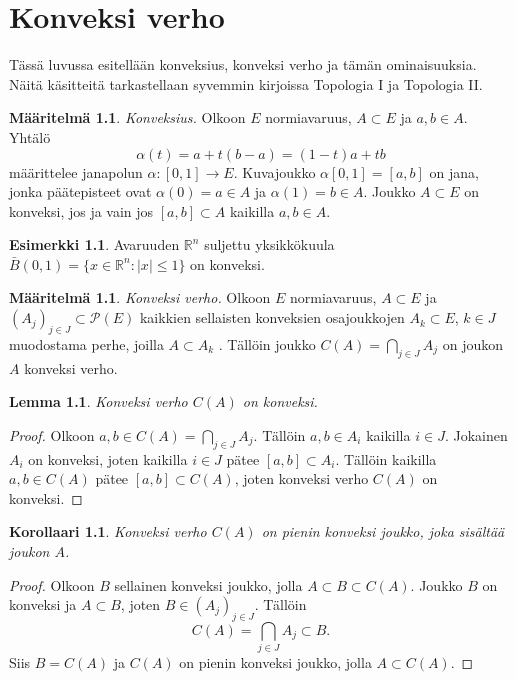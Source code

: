 \documentclass[12pt,a4paper,leqno]{report}
\newcommand{\R}{\mathbb{R}}
\theoremstyle{plain}
\newtheorem{lem}[equation]{Lemma}
\newtheorem{kor}[equation]{Korollaari}
\theoremstyle{definition}
\newtheorem{maar}[equation]{Määritelmä}
\newtheorem{esim}[equation]{Esimerkki}
\theoremstyle{remark}
\begin{document}
\chapter{Konveksi verho}\label{konverho}
Tässä luvussa esitellään konveksius, konveksi verho ja tämän ominaisuuksia. Näitä käsitteitä tarkastellaan syvemmin kirjoissa Topologia I ja Topologia II.
\begin{maar}%
\emph{Konveksius.}
 Olkoon $E$ normiavaruus, $A\subset E$ ja $a,b\in A$. Yhtälö 
$$\alpha (t)=a+t(b-a)=(1-t)a+tb$$ 
määrittelee janapolun $\alpha \colon [0,1]\rightarrow E$. Kuvajoukko $\alpha [0,1] = [a,b]$ on jana, jonka päätepisteet ovat $\alpha (0)=a\in A$ ja $\alpha (1)=b\in A$. 
Joukko $A\subset E$ on konveksi, jos ja vain jos $[a,b]\subset A$ kaikilla $a,b\in A$.
\end{maar}
\begin{esim}
Avaruuden $\R ^n$ suljettu yksikkökuula $ \bar B(0,1)= \{x\in \R ^n \colon |x|\leq 1\}$ on konveksi.
\end{esim}
\begin{maar}\emph{Konveksi verho.} Olkoon $E$ normiavaruus, $A\subset E$ ja $(A_j)_{j\in J}\subset \mathcal{P}(E)$ 
kaikkien sellaisten konveksien osajoukkojen $A_k\subset E$, $k\in J$ muodostama perhe, joilla %
$A\subset A_k$%
. Tällöin joukko $C(A)=\bigcap_{j\in J} A_j$ on joukon $A$ konveksi verho. 
\end{maar}
\begin{lem} Konveksi verho $C(A)$ on konveksi.\end{lem} 
\begin{proof} Olkoon $a,b\in C(A)=\bigcap_{j\in J} A_j$. 
Tällöin $a,b\in A_i$ kaikilla $i\in J$. %
Jokainen $A_i$ on konveksi, joten kaikilla $i\in J$ pätee $[a,b]\subset A_i$.
Tällöin kaikilla $a,b\in C(A)$ pätee $[a,b] \subset C(A)$, joten konveksi verho $C(A)$ on konveksi.
\end{proof}
\begin{kor}Konveksi verho $C(A)$ on pienin konveksi joukko, joka sisältää joukon $A$.
\end{kor}
\begin{proof} Olkoon $B$ sellainen konveksi joukko, jolla $A\subset B\subset C(A)$. 
Joukko $B$ on konveksi ja $A\subset B$, joten $B\in (A_j)_{j\in J}$. 
Tällöin $$C(A)=\bigcap_{j\in J} A_j\subset B.$$
Siis $B= C(A)$ ja $C(A)$ on pienin konveksi joukko, jolla $A\subset C(A)$.
\end{proof}
\end{document}

